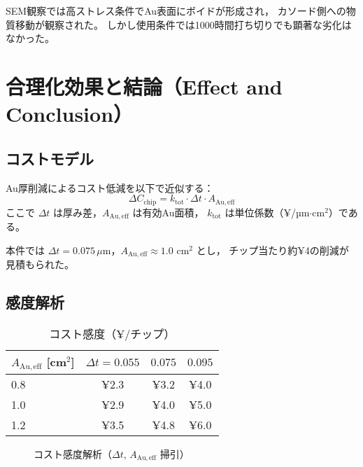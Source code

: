 \documentclass[conference]{IEEEtran}
\begin{document}
SEM観察では高ストレス条件でAu表面にボイドが形成され，
カソード側への物質移動が観察された。
しかし使用条件では1000時間打ち切りでも顕著な劣化はなかった。

\section{合理化効果と結論（Effect and Conclusion）}

\subsection{コストモデル}
Au厚削減によるコスト低減を以下で近似する：
\begin{equation}
  \Delta C_{\mathrm{chip}}
  = k_{\mathrm{tot}} \cdot \Delta t \cdot A_{\mathrm{Au,eff}}
\end{equation}
ここで $\Delta t$ は厚み差，$A_{\mathrm{Au,eff}}$ は有効Au面積，
$k_{\mathrm{tot}}$ は単位係数（¥/µm$\cdot$cm$^2$）である。

本件では $\Delta t=0.075\,\mu$m，$A_{\mathrm{Au,eff}}\approx1.0$ cm$^2$ とし，
チップ当たり約¥4の削減が見積もられた。

\subsection{感度解析}
\begin{table}[htbp]
  \centering
  \caption{コスト感度（¥/チップ）}
  \label{tab:cost-sense}
  \begin{tabular}{@{}lccc@{}}
    \toprule
    $A_{\mathrm{Au,eff}}$ [cm$^2$] & $\Delta t=0.055$ & $0.075$ & $0.095$ \\
    \midrule
    0.8 & ¥2.3 & ¥3.2 & ¥4.0 \\
    1.0 & ¥2.9 & ¥4.0 & ¥5.0 \\
    1.2 & ¥3.5 & ¥4.8 & ¥6.0 \\
    \bottomrule
  \end{tabular}
\end{table}

\begin{figure}[htbp]
  \centering
  \caption{コスト感度解析（$\Delta t$, $A_{\mathrm{Au,eff}}$ 掃引）}
  \label{fig:cost-sense}
\end{figure}
\end{document}
